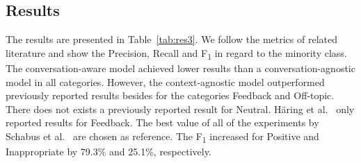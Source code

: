 \subsection{Results}
\label{sec:ompc_results}

The results are presented in Table~\ref{tab:res3}.
We follow the metrics of related literature and show the Precision, Recall and F\textsubscript{1} in regard to the minority class.
The conversation-aware model achieved lower results than a conversation-agnostic model in all categories.
However, the context-agnostic model outperformed previously reported results besides for the categories Feedback and Off-topic.
There does not exists a previously reported result for Neutral.
H{\"a}ring et al.~\cite{haring2018addressed} only reported results for Feedback.
The best value of all of the experiments by Schabus et al.~\cite{schabus_academic-industrial_nodate} are chosen as reference.
The F\textsubscript{1} increased for Positive and Inappropriate by 79.3\% and 25.1\%, respectively.

